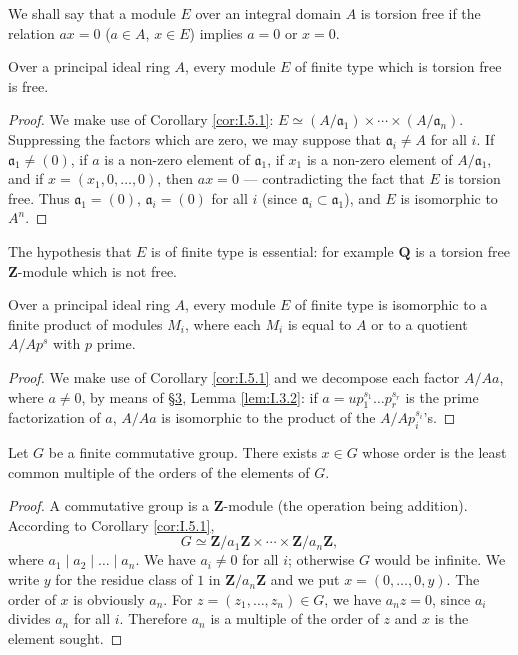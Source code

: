 We shall say that a module $E$ over an integral domain $A$ is torsion free
if the relation $ax=0$ ($a\in A$, $x\in E$) implies $a=0$ or $x=0$.

\begin{corollary}
\label{cor:I.5.2}
Over a principal ideal ring $A$, every module $E$ of finite type which is
torsion free is free.
\end{corollary}

\begin{proof}
We make use of Corollary \ref{cor:I.5.1}:
$E\simeq(A/\mathfrak{a}_{1})\times\cdots\times(A/\mathfrak{a}_{n})$.
Suppressing the factors which are zero, we may suppose that
$\mathfrak{a}_{i}\neq A$ for all $i$. If $\mathfrak{a}_{1}\neq(0)$, if $a$ is
a non-zero element of $\mathfrak{a}_{1}$, if $x_{1}$ is a non-zero element
of $A/\mathfrak{a}_{1}$, and if $x=(x_{1},0,\ldots,0)$, then $ax=0$ ---
contradicting the fact that $E$ is torsion free. Thus
$\mathfrak{a}_{1}=(0)$, $\mathfrak{a}_{i}=(0)$ for all $i$ (since
$\mathfrak{a}_{i}\subset\mathfrak{a}_{1}$), and $E$ is isomorphic to $A^{n}$.
\end{proof}

The hypothesis that $E$ is of finite type is essential: for example
$\mathbf{Q}$ is a torsion free $\mathbf{Z}$-module which is not free.

\begin{corollary}
\label{cor:I.5.3}
Over a principal ideal ring $A$, every module $E$ of finite type is
isomorphic to a finite product of modules $M_{i}$, where each $M_{i}$ is
equal to $A$ or to a quotient $A/Ap^{s}$ with $p$ prime.
\end{corollary}

\begin{proof}
We make use of Corollary \ref{cor:I.5.1} and we decompose each factor
$A/Aa$, where $a\neq0$, by means of \hyperref[sec:1.3]{§3}, Lemma \ref{lem:I.3.2}: if
$a=up_{1}^{s_{1}}\ldots p_{r}^{s_{r}}$ is the prime factorization of $a$,
$A/Aa$ is isomorphic to the product of the $A/Ap_{i}^{s_{i}}$'s.
\end{proof}

\begin{corollary}
\label{cor:I.5.4}
Let $G$ be a finite commutative group. There exists $x\in G$ whose order is
the least common multiple of the orders of the elements of $G$.
\end{corollary}

\begin{proof}
A commutative group is a $\mathbf{Z}$-module (the operation being addition).
According to Corollary \ref{cor:I.5.1},
\[
G\simeq\mathbf{Z}/a_{1}\mathbf{Z}\times\cdots\times
\mathbf{Z}/a_{n}\mathbf{Z},
\]
where $a_{1}\mid a_{2}\mid\ldots\mid a_{n}$. We have $a_{i}\neq0$ for all
$i$; otherwise $G$ would be infinite. We write $y$ for the residue class of
$1$ in $\mathbf{Z}/a_{n}\mathbf{Z}$ and we put $x=(0,\ldots,0,y)$. The order
of $x$ is obviously $a_{n}$. For $z=(z_{1},\ldots,z_{n})\in G$, we have
$a_{n}z=0$, since $a_{i}$ divides $a_{n}$ for all $i$. Therefore $a_{n}$ is
a multiple of the order of $z$ and $x$ is the element sought.
\end{proof}


